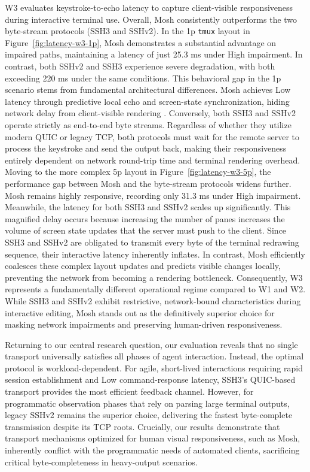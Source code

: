 W3 evaluates keystroke-to-echo latency to capture client-visible responsiveness during interactive terminal use. Overall, Mosh consistently outperforms the two byte-stream protocols (SSH3 and SSHv2). In the 1p \texttt{tmux} layout in Figure~\ref{fig:latency-w3-1p}, Mosh demonstrates a substantial advantage on impaired paths, maintaining a latency of just 25.3 ms under High impairment. In contrast, both SSHv2 and SSH3 experience severe degradation, with both exceeding 220 ms under the same conditions. This behavioral gap in the 1p scenario stems from fundamental architectural differences. Mosh achieves Low latency through predictive local echo and screen-state synchronization, hiding network delay from client-visible rendering \cite{Winstein2012}. Conversely, both SSH3 and SSHv2 operate strictly as end-to-end byte streams. Regardless of whether they utilize modern QUIC or legacy TCP, both protocols must wait for the remote server to process the keystroke and send the output back, making their responsiveness entirely dependent on network round-trip time and terminal rendering overhead. Moving to the more complex 5p layout in Figure~\ref{fig:latency-w3-5p}, the performance gap between Mosh and the byte-stream protocols widens further. Mosh remains highly responsive, recording only 31.3 ms under High impairment. Meanwhile, the latency for both SSH3 and SSHv2 scales up significantly. This magnified delay occurs because increasing the number of panes increases the volume of screen state updates that the server must push to the client. Since SSH3 and SSHv2 are obligated to transmit every byte of the terminal redrawing sequence, their interactive latency inherently inflates. In contrast, Mosh efficiently coalesces these complex layout updates and predicts visible changes locally, preventing the network from becoming a rendering bottleneck. Consequently, W3 represents a fundamentally different operational regime compared to W1 and W2. While SSH3 and SSHv2 exhibit restrictive, network-bound characteristics during interactive editing, Mosh stands out as the definitively superior choice for masking network impairments and preserving human-driven responsiveness.


Returning to our central research question, our evaluation reveals that no single transport universally satisfies all phases of agent interaction. Instead, the optimal protocol is workload-dependent. For agile, short-lived interactions requiring rapid session establishment and Low command-response latency, SSH3’s QUIC-based transport provides the most efficient feedback channel. However, for programmatic observation phases that rely on parsing large terminal outputs, legacy SSHv2 remains the superior choice, delivering the fastest byte-complete transmission despite its TCP roots. Crucially, our results demonstrate that transport mechanisms optimized for human visual responsiveness, such as Mosh, inherently conflict with the programmatic needs of automated clients, sacrificing critical byte-completeness in heavy-output scenarios.
